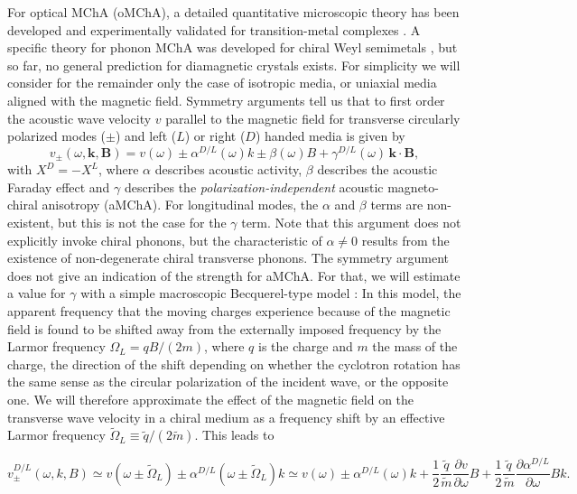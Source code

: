 \documentclass[prl,twocolumn]{revtex4-2}
\begin{document}
For optical MChA (oMChA), a detailed quantitative microscopic theory has
been developed \cite{BarronVbrancich} and experimentally validated for
transition-metal complexes \cite{ValidationMChA}. A specific theory for
phonon MChA was developed for chiral Weyl semimetals \cite{Phonon-MChA-Weyl}
, but so far, no general prediction for diamagnetic crystals exists. For
simplicity we will consider for the remainder only the case of isotropic
media, or uniaxial media aligned with the magnetic field. Symmetry arguments
tell us that to first order the acoustic wave velocity $v$ parallel to the
magnetic field for transverse circularly polarized modes ($\pm$) and left ($L
$) or right ($D$) handed media is given by
\begin{equation}
v_{\pm }(\omega,\mathbf{k},\mathbf{B})=v(\omega)\pm \alpha^{D/L}(\omega)k\pm
\beta(\omega)B+\gamma^{D/L}(\omega)\,\mathbf{k}\!\cdot\!\mathbf{B},
\label{sym2}
\end{equation}
with $X^{D}=-X^{L}$, where $\alpha$ describes acoustic activity, $\beta$
describes the acoustic Faraday effect and $\gamma$ describes the \textit{
polarization-independent} acoustic magneto-chiral anisotropy (aMChA). For
longitudinal modes, the $\alpha$ and $\beta$ terms are non-existent, but
this is not the case for the $\gamma$ term. Note that this argument does not
explicitly invoke chiral phonons, but the characteristic of $\alpha\neq 0$
results from the existence of non-degenerate chiral transverse phonons. The
symmetry argument does not give an indication of the strength for aMChA. For
that, we will estimate a value for $\gamma$ with a simple macroscopic
Becquerel-type model \cite{Sup-mat}: In this model, the apparent frequency
that the moving charges experience because of the magnetic field is found to
be shifted away from the externally imposed frequency by the Larmor
frequency $\Omega_{L}=qB/(2m)$, where $q$ is the charge and $m$ the mass of
the charge, the direction of the shift depending on whether the cyclotron
rotation has the same sense as the circular polarization of the incident
wave, or the opposite one. We will therefore approximate the effect of the
magnetic field on the transverse wave velocity in a chiral medium as a
frequency shift by an effective Larmor frequency $\widetilde{\Omega}
_{L}\equiv \widetilde{q}/(2\widetilde{m})$. This leads to \cite{Sup-mat}
\begin{widetext}
\begin{equation}
v_{\pm}^{D/L}(\omega,k,B) \simeq v(\omega \pm \tilde{\Omega}_L)
 \pm \alpha^{D/L}(\omega \pm \tilde{\Omega}_L) k
 \simeq v(\omega)
 \pm \alpha^{D/L}(\omega) k
 + \frac{1}{2}\frac{\tilde{q}}{\tilde{m}} \frac{\partial v}{\partial \omega} B
 + \frac{1}{2}\frac{\tilde{q}}{\tilde{m}} \frac{\partial \alpha^{D/L}}{\partial \omega} B k.
 \label{Chiral Becquerel}
\end{equation}
\end{widetext}
\end{document}
